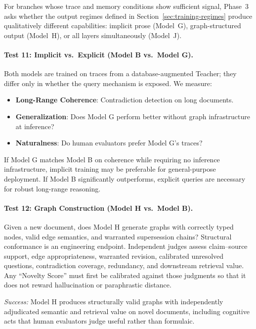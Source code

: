 For branches whose trace and memory conditions show sufficient signal, Phase~3
asks whether the output regimes defined in
Section~\ref{sec:training-regimes} produce qualitatively different
capabilities: implicit prose (Model~G), graph-structured output (Model~H), or all
layers simultaneously (Model~J).

\paragraph{Test 11: Implicit vs.\ Explicit (Model B vs.\ Model G).}
Both models are trained on traces from a database-augmented Teacher; they
differ only in whether the query mechanism is exposed. We measure:
\begin{itemize}
    \item \textbf{Long-Range Coherence}: Contradiction detection on long
    documents.
    \item \textbf{Generalization}: Does Model G perform better without graph
    infrastructure at inference?
    \item \textbf{Naturalness}: Do human evaluators prefer Model G's traces?
\end{itemize}
If Model G matches Model B on coherence while requiring no inference
infrastructure, implicit training may be preferable for general-purpose
deployment. If Model B significantly outperforms, explicit queries are
necessary for robust long-range reasoning.

\paragraph{Test 12: Graph Construction (Model H vs.\ Model B).}
Given a new document, does Model H generate graphs with correctly typed nodes,
valid edge semantics, and warranted supersession chains? Structural conformance
is an engineering endpoint. Independent judges assess claim--source support,
edge appropriateness, warranted revision, calibrated unresolved questions,
contradiction coverage, redundancy, and downstream retrieval value. Any
``Novelty Score'' must first be calibrated against those judgments so that it
does not reward hallucination or paraphrastic distance.

\emph{Success:} Model H produces structurally valid graphs with independently
adjudicated semantic and retrieval value on novel documents, including
cognitive acts that human evaluators judge useful rather than formulaic.

